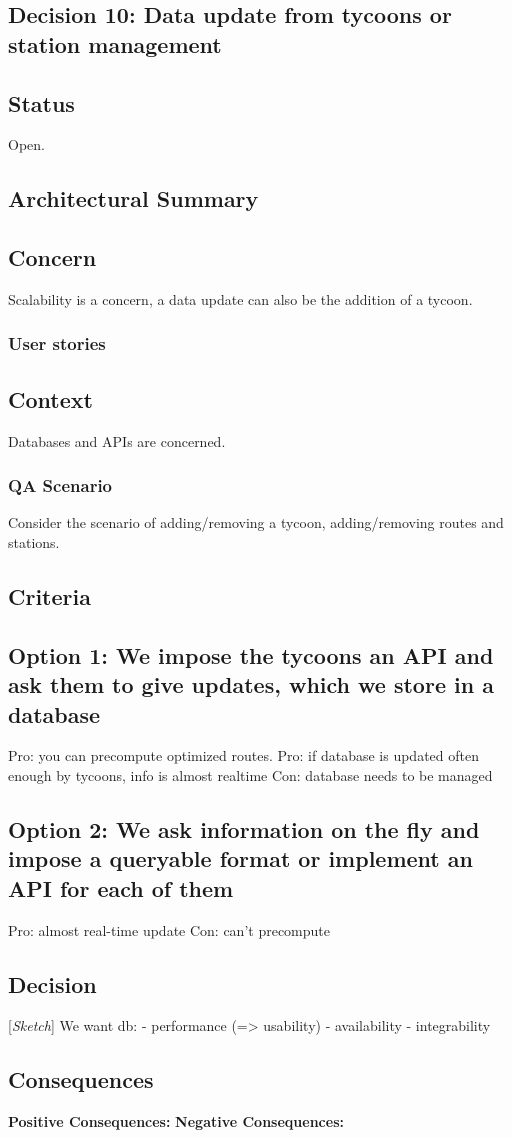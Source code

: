 \subsection{Decision 10: Data update from tycoons or station management}

\subsection*{Status}
Open.
\subsection*{Architectural Summary}


\subsection*{Concern}
Scalability is a concern, a data update can also be the addition of a tycoon.
\subsubsection*{User stories}

\subsection*{Context}
Databases and APIs are concerned.
\subsubsection*{QA Scenario} %
Consider the scenario of adding/removing a tycoon, adding/removing routes and stations.
\subsection*{Criteria}

\subsection*{Option 1: We impose the tycoons an API and ask them to give updates, which we store in a database}
Pro: you can precompute optimized routes.
Pro: if database is updated often enough by tycoons, info is almost realtime
Con: database needs to be managed

\subsection*{Option 2: We ask information on the fly and impose a queryable format or implement an API for each of them}
Pro: almost real-time update
Con: can't precompute

\subsection*{Decision}[\textit{Sketch}]
We want db:
- performance (=> usability)
- availability 
- integrability

\subsection*{Consequences}
\textbf{Positive Consequences:}
\textbf{Negative Consequences:}
